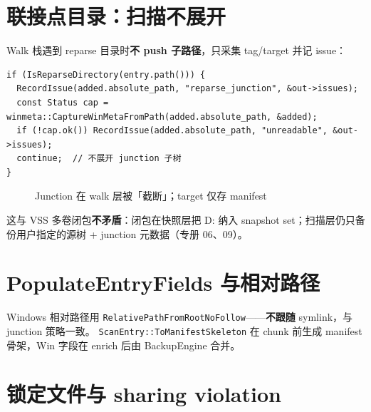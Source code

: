 \section{联接点目录：扫描不展开}\label{sec:junction-scan}

Walk 栈遇到 reparse 目录时\textbf{不 push 子路径}，只采集 tag/target 并记 issue：

\begin{lstlisting}[caption={Junction 扫描分支 (scan\_entry.cc)}]
if (IsReparseDirectory(entry.path())) {
  RecordIssue(added.absolute_path, "reparse_junction", &out->issues);
  const Status cap = winmeta::CaptureWinMetaFromPath(added.absolute_path, &added);
  if (!cap.ok()) RecordIssue(added.absolute_path, "unreadable", &out->issues);
  continue;  // 不展开 junction 子树
}
\end{lstlisting}

\begin{figure}[htbp]
\centering
{}
\caption{Junction 在 walk 层被「截断」；target 仅存 manifest}
\end{figure}

这与 VSS 多卷闭包\textbf{不矛盾}：闭包在快照层把 D: 纳入 snapshot set；扫描层仍只备份用户指定的源树 + junction 元数据（专册 06、09）。

\section{PopulateEntryFields 与相对路径}

Windows 相对路径用 \texttt{RelativePathFromRootNoFollow}——\textbf{不跟随} symlink，与 junction 策略一致。
\texttt{ScanEntry::ToManifestSkeleton} 在 chunk 前生成 manifest 骨架，Win 字段在 enrich 后由 BackupEngine 合并。

\section{锁定文件与 sharing violation}

